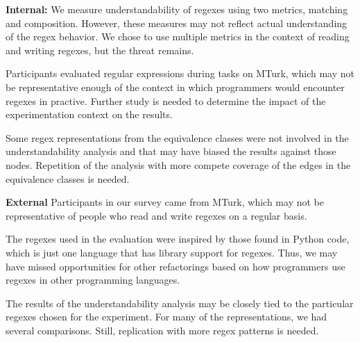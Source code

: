 \textbf{Internal:}
We measure understandability of regexes using two metrics, matching and composition. However, these measures may not reflect actual understanding of the regex behavior. We chose to use multiple metrics in the context of reading and writing regexes, but the threat remains.

Participants evaluated regular expressions during tasks on MTurk, which may not be representative enough of the context in which programmers would encounter regexes in practive. Further study is needed to determine the impact of the experimentation context on the results.

Some regex representations from the equivalence classes were not involved in the understandability analysis and that may have biased the results against those nodes. Repetition of the analysis with more compete coverage of the edges in the equivalence classes is needed.




%

\textbf{External}
Participants in our survey came from MTurk, which may not be representative of people who read and write regexes on a regular basis.

The regexes  used in the evaluation were inspired by those found in Python code, which is just one language that has library support for regexes. Thus, we may have missed opportunities for other refactorings based on how programmers use regexes in other programming languages.

The results of the understandability analysis may be closely tied to the particular regexes chosen for the experiment. For many of the representations, we had several comparisons. Still, replication with more regex patterns is needed.%

